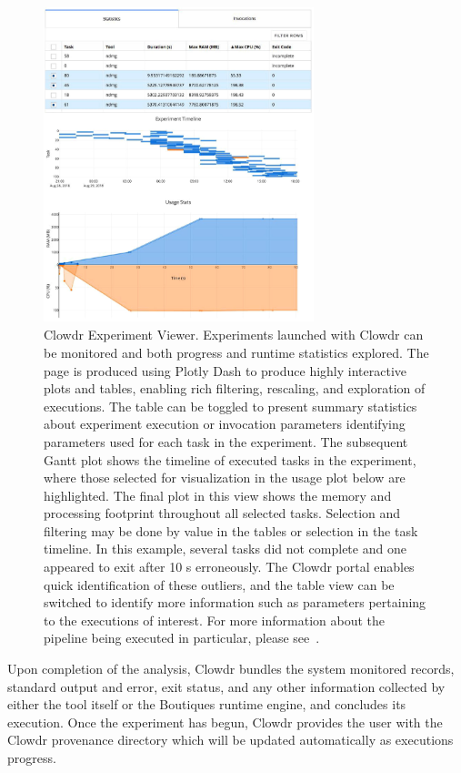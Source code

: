 \documentclass[fleqn,12pt]{SelfArx_ch} %
\begin{document}
\begin{figure}[p!]
\centering
\includegraphics[width=0.7\textwidth]{./figures/fig3.jpg}
\caption{Clowdr Experiment Viewer. Experiments launched with Clowdr can be monitored and both progress and runtime
statistics explored. The page is produced using Plotly Dash to produce highly interactive plots and tables, enabling
rich filtering, rescaling, and exploration of executions. The table can be toggled to present summary statistics about
experiment execution or invocation parameters identifying parameters used for each task in the experiment. The
subsequent Gantt plot shows the timeline of executed tasks in the experiment, where those selected for visualization in
the usage plot below are highlighted. The final plot in this view shows the memory and processing footprint throughout
all selected tasks. Selection and filtering may be done by value in the tables or selection in the task timeline. In
this example, several tasks did not complete and one appeared to exit after 10 s erroneously. The Clowdr portal enables
quick identification of these outliers, and the table view can be switched to identify more information such as
parameters pertaining to the executions of interest. For more information about the pipeline being executed in
particular, please see~\cite{Kiar2018-lz}.}
\label{fig:ch1.3}
\end{figure}

Upon completion of the analysis, Clowdr bundles the system monitored records, standard output and error, exit status,
and any other information collected by either the tool itself or the Boutiques runtime engine, and concludes its
execution. Once the experiment has begun, Clowdr provides the user with the Clowdr provenance directory which will be
updated automatically as executions progress.
\end{document}

